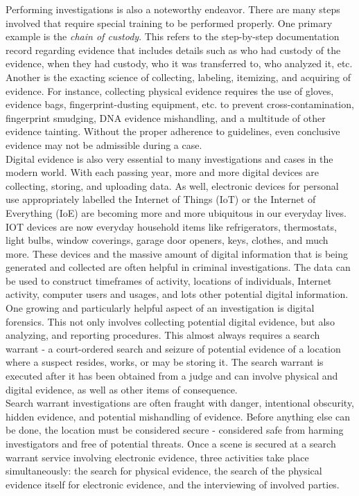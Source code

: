 \documentclass[12pt]{article}
\begin{document}
Performing investigations is also a noteworthy endeavor.  There are many steps involved that require special
training to be performed properly.  One primary example is the {\em chain of custody}.  This refers to the 
step-by-step documentation record regarding evidence that includes details such as who had custody of
the evidence, when they had custody, who it was transferred to, who analyzed it, etc.
Another is the exacting
science of collecting, labeling, itemizing, and acquiring of evidence.
For instance, collecting physical evidence requires the
use of gloves,
evidence bags, fingerprint-dusting equipment, etc. to prevent cross-contamination, fingerprint smudging,
DNA evidence mishandling, and a multitude of other evidence tainting.  Without the proper adherence to 
guidelines,
even conclusive evidence may not be admissible during a case.\\

Digital evidence is also very essential to many investigations and cases in the modern world.
With each passing year, more and more digital devices are collecting, storing, and uploading data.  As
well, electronic devices for personal use appropriately labelled the Internet of Things (IoT) or
the Internet of Everything (IoE) are becoming more and more
ubiquitous in our everyday lives.  IOT devices are now everyday household items like refrigerators,
thermostats, light bulbs, window coverings, garage door openers, keys, clothes, and much more.
These devices and the massive amount of digital information that
is being generated and collected are often helpful in criminal investigations.  The data can be used to
construct timeframes of activity, locations of individuals, Internet activity, computer users and usages,
and lots other potential digital information.\\

One growing and particularly helpful aspect of an investigation is digital forensics.  This not only 
involves collecting potential digital evidence, but also analyzing, 
and reporting procedures.  This almost always requires a search warrant - a court-ordered search and
seizure of potential evidence of a location where a suspect resides, works, or may be storing it.
The search warrant is executed after it has been obtained from a judge and can involve physical and
digital evidence, as well as other items of consequence.\\

Search warrant investigations are often fraught with danger, intentional obscurity, hidden evidence, and
potential mishandling of evidence.  Before anything else can be done, the location must be considered
secure - considered safe from harming investigators and free of potential threats.  Once a scene is
secured at a search warrant service involving electronic evidence, three activities
take place simultaneously: the search for physical evidence, the search of the physical evidence
itself for electronic evidence, and the interviewing of involved parties.\\
\end{document}
